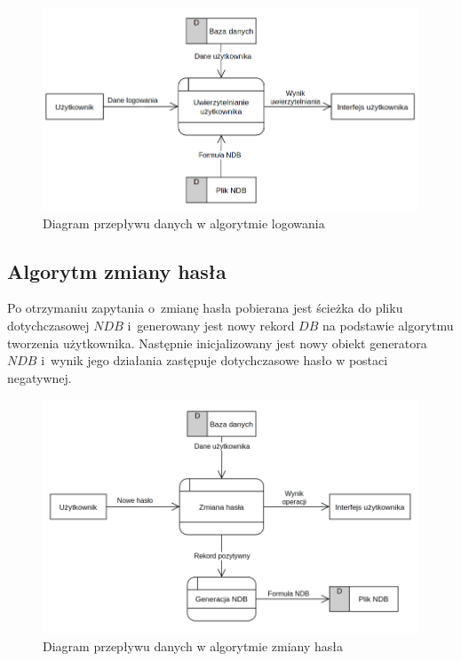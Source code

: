 \begin{figure}[h]
    \includegraphics[width = 15.5cm]{img/diagrams/dfdlogin.png}
    \centering
    \caption{Diagram przepływu danych w algorytmie logowania}
    \label{img:dfd-login}
\end{figure}


\subsection{Algorytm zmiany hasła}
Po otrzymaniu zapytania o~zmianę hasła pobierana jest ścieżka do pliku dotychczasowej $NDB$ i~generowany jest nowy rekord $DB$ na podstawie algorytmu tworzenia użytkownika. Następnie inicjalizowany jest nowy obiekt generatora $NDB$ i~wynik jego działania zastępuje
dotychczasowe hasło w postaci negatywnej.

\begin{figure}[h]
    \includegraphics[width = 15.5cm]{img/diagrams/dfdchange.png}
    \centering
    \caption{Diagram przepływu danych w algorytmie zmiany hasła}
    \label{img:dfd-change}
\end{figure}

